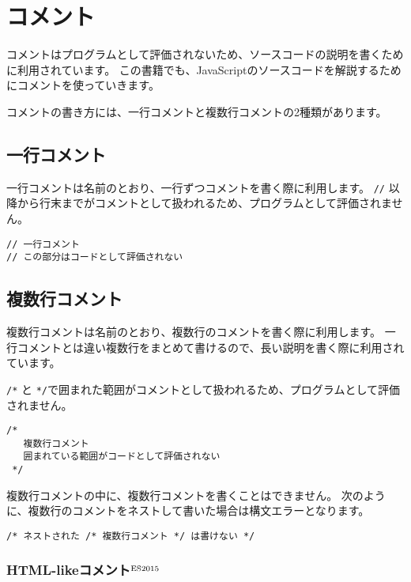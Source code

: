 \hypertarget{comment}{%
\chapter{コメント}\label{comment}}

コメントはプログラムとして評価されないため、ソースコードの説明を書くために利用されています。
この書籍でも、JavaScriptのソースコードを解説するためにコメントを使っていきます。

コメントの書き方には、一行コメントと複数行コメントの2種類があります。

\hypertarget{single-line-comment}{%
\section{一行コメント}\label{single-line-comment}}

一行コメントは名前のとおり、一行ずつコメントを書く際に利用します。
\texttt{//}
以降から行末までがコメントとして扱われるため、プログラムとして評価されません。

\begin{lstlisting}
// 一行コメント
// この部分はコードとして評価されない
\end{lstlisting}

\hypertarget{multi-line-comment}{%
\section{複数行コメント}\label{multi-line-comment}}

複数行コメントは名前のとおり、複数行のコメントを書く際に利用します。
一行コメントとは違い複数行をまとめて書けるので、長い説明を書く際に利用されています。

\texttt{/*} と
\texttt{*/}で囲まれた範囲がコメントとして扱われるため、プログラムとして評価されません。

\begin{lstlisting}
/* 
   複数行コメント
   囲まれている範囲がコードとして評価されない
 */
\end{lstlisting}

複数行コメントの中に、複数行コメントを書くことはできません。
次のように、複数行のコメントをネストして書いた場合は構文エラーとなります。

\begin{lstlisting}
/* ネストされた /* 複数行コメント */ は書けない */
\end{lstlisting}

\hypertarget{html-like-comment}{%
\subsection{HTML-likeコメント{$^{\rm ES2015}$}}\label{html-like-comment}}

